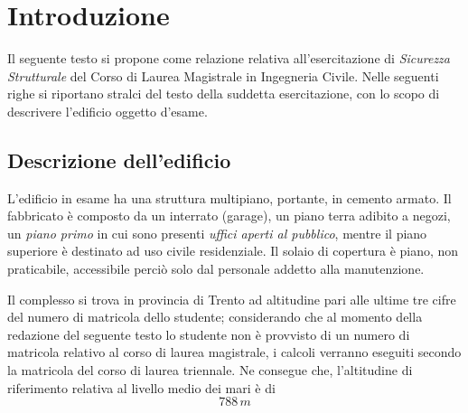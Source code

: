\pagestyle{plain}
\chapter{Introduzione}
Il seguente testo si propone come relazione relativa all'esercitazione di \emph{Sicurezza Strutturale} del Corso di Laurea Magistrale in Ingegneria Civile. Nelle seguenti righe si riportano stralci del testo della suddetta esercitazione, con lo scopo di descrivere l'edificio oggetto d'esame.

\section{Descrizione dell'edificio}\label{sec:descrizioneEdificio}
L'edificio in esame ha una struttura multipiano, portante, in cemento armato. Il fabbricato è composto da un interrato (garage), un piano terra adibito a negozi, un \emph{piano primo} in cui sono presenti \emph{uffici aperti al pubblico}, mentre il piano superiore è destinato ad uso civile residenziale. Il solaio di copertura è piano, non praticabile, accessibile perciò solo dal personale addetto alla manutenzione.

Il complesso si trova in provincia di Trento ad altitudine pari alle ultime tre cifre del numero di matricola dello studente; considerando che al momento della redazione del seguente testo lo studente non è provvisto di un numero di matricola relativo al corso di laurea magistrale, i calcoli verranno eseguiti secondo la matricola del corso di laurea triennale. Ne consegue che, l'altitudine di riferimento relativa al livello medio dei mari è di
\begin{equation*}
 788\,m
\end{equation*}


